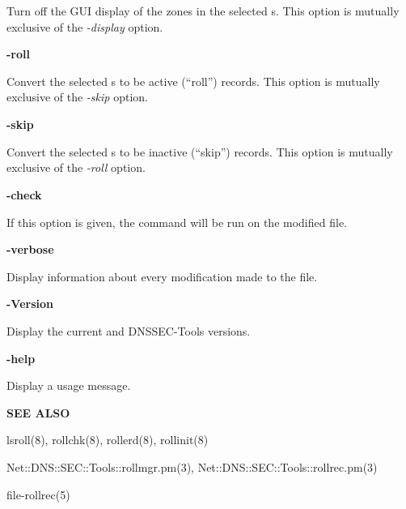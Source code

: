 \begin{description}
Turn off the GUI display of the zones in the selected s.
This option is mutually exclusive of the {\it -display} option.

\item {\bf -roll}\verb" "

Convert the selected s to be active (``roll'') records.
This option is mutually exclusive of the {\it -skip} option.

\item {\bf -skip}\verb" "

Convert the selected s to be inactive (``skip'') records.
This option is mutually exclusive of the {\it -roll} option.

\item {\bf -check}\verb" "

If this option is given, the  command will be run on the modified
 file.

\item {\bf -verbose}\verb" "

Display information about every modification made to the  file.

\item {\bf -Version}\verb" "

Display the current  and DNSSEC-Tools versions.

\item {\bf -help}\verb" "

Display a usage message.

\end{description}

{\bf SEE ALSO}

lsroll(8),
rollchk(8),
rollerd(8),
rollinit(8)

Net::DNS::SEC::Tools::rollmgr.pm(3),
Net::DNS::SEC::Tools::rollrec.pm(3)

file-rollrec(5)

